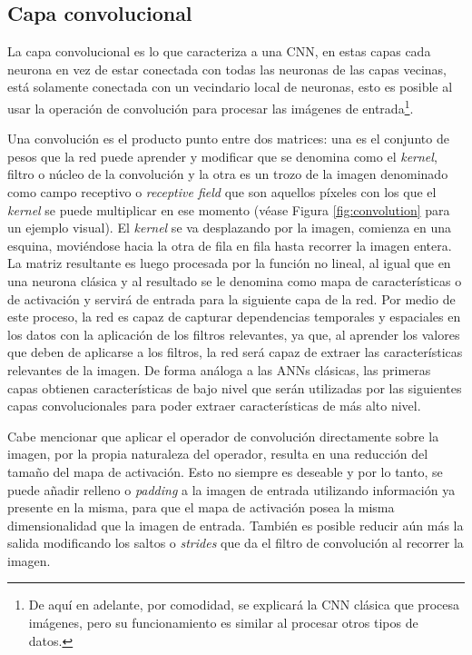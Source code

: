 \subsection{Capa convolucional}
La capa convolucional es lo que caracteriza a una CNN, en estas capas cada neurona en vez de estar conectada con todas las neuronas de las capas vecinas, está solamente conectada con un vecindario local de neuronas, esto es posible al usar la operación de convolución para procesar las imágenes de entrada\footnote{De aquí en adelante, por comodidad, se explicará la CNN clásica que procesa imágenes, pero su funcionamiento es similar al procesar otros tipos de datos.}.

Una convolución es el producto punto entre dos matrices: una es el conjunto de pesos que la red puede aprender y modificar que se denomina como el \textit{kernel}, filtro o núcleo de la convolución y la otra es un trozo de la imagen denominado como campo receptivo o \textit{receptive field} que son aquellos píxeles con los que el \textit{kernel} se puede multiplicar en ese momento (véase Figura \ref{fig:convolution} para un ejemplo visual). El \textit{kernel} se va desplazando por la imagen, comienza en una esquina, moviéndose hacia la otra de fila en fila hasta recorrer la imagen entera. La matriz resultante es luego procesada por la función no lineal, al igual que en una neurona clásica y al resultado se le denomina como mapa de características o de activación y servirá de entrada para la siguiente capa de la red. Por medio de este proceso, la red es capaz de capturar dependencias temporales y espaciales en los datos con la aplicación de los filtros relevantes, ya que, al aprender los valores que deben de aplicarse a los filtros, la red será capaz de extraer las características relevantes de la imagen. De forma análoga a las ANNs clásicas, las primeras capas obtienen características de bajo nivel que serán utilizadas por las siguientes capas convolucionales para poder extraer características de más alto nivel.

Cabe mencionar que aplicar el operador de convolución directamente sobre la imagen, por la propia naturaleza del operador, resulta en una reducción del tamaño del mapa de activación. Esto no siempre es deseable y por lo tanto, se puede añadir relleno o \textit{padding} a la imagen de entrada utilizando información ya presente en la misma, para que el mapa de activación posea la misma dimensionalidad que la imagen de entrada. También es posible reducir aún más la salida modificando los saltos o \textit{strides} que da el filtro de convolución al recorrer la imagen.

